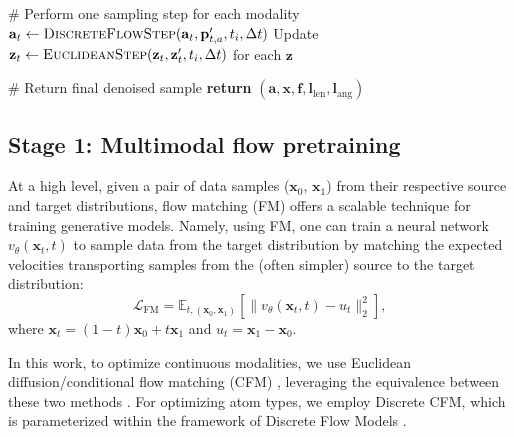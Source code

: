 \documentclass{article}
\theoremstyle{plain}
\theoremstyle{definition}
\theoremstyle{remark}
\begin{document}
\begin{algorithm}[tb]
\begin{algorithmic}[1]
    \item[] \quad \textcolor{commentcolor}{\# Perform one sampling step for each modality}
    \STATE \quad $\mathbf{a}_t \gets \textsc{DiscreteFlowStep}(\mathbf{a}_t, \mathbf{p}'_{t, a}, t_i, \Delta t)$
    \STATE \quad Update $\mathbf{z}_t \gets \textsc{EuclideanStep}(\mathbf{z}_t, \mathbf{z}'_t, t_i, \Delta t)$ for each $\mathbf{z}$
  \ENDFOR

  \item[] \textcolor{commentcolor}{\# Return final denoised sample}
  \STATE \textbf{return} $(\mathbf{a}, \mathbf{x}, \mathbf{f}, \mathbf{l}_\text{len}, \mathbf{l}_\text{ang})$
\end{algorithmic}
\end{algorithm}

\subsection{Stage 1: Multimodal flow pretraining}
\label{subsection:multimodal_flow_pretraining}

At a high level, given a pair of data samples ($\mathbf{x}_0$, $\mathbf{x}_1$) from their respective source and target distributions, flow matching (FM) offers a scalable technique for training generative models. Namely, using FM, one can train a neural network $v_\theta(\mathbf{x}_t, t)$ to sample data from the target distribution by matching the expected velocities transporting samples from the (often simpler) source to the target distribution:
\begin{equation}
    \mathcal{L}_\text{FM} = \mathbb{E}_{t, (\mathbf{x}_0, \mathbf{x}_1)} [\lVert v_\theta(\mathbf{x}_t, t) - u_t \rVert_2^2],
\end{equation}
where $\mathbf{x}_t = (1 - t)\mathbf{x}_0 + t\mathbf{x}_1$ and $u_t = \mathbf{x}_1 - \mathbf{x}_0$.

In this work, to optimize continuous modalities, we use Euclidean diffusion/conditional flow matching (CFM) \citep{sohl2015deep,song2019generative,ho2020denoising,lipman2023flow,albergo2023building,tong2024improving}, leveraging the equivalence between these two methods \citep{diffusionflow2024}. For optimizing atom types, we employ Discrete CFM, which is parameterized within the framework of Discrete Flow Models \citep{campbell24dfm}.
\end{document}
